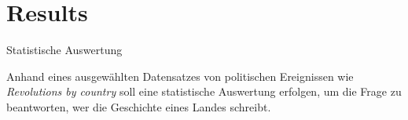 \chapter{Results}\label{ch:results}

\begin{todos}
    \item Statistische Auswertung
\end{todos}

Anhand eines ausgewählten Datensatzes von politischen Ereignissen wie \emph{Revolutions by country} soll eine statistische Auswertung erfolgen, um die Frage zu beantworten, wer die Geschichte eines Landes schreibt.

